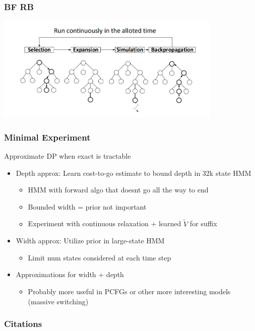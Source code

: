 \documentclass{beamer}
\begin{document}
\begin{frame}
\frametitle{BF RB}
\includegraphics[height=2in]{img/mcts.png}
\end{frame}

\begin{frame}
\frametitle{Minimal Experiment}
Approximate DP when exact is tractable
\begin{itemize}
\item Depth approx: Learn cost-to-go estimate to bound depth in 32k state HMM
    \begin{itemize}
    \item HMM with forward algo that doesnt go all the way to end
    \item Bounded width = prior not important
    \item Experiment with continuous relaxation + learned $\tilde{V}$
        for suffix
    \end{itemize}
\item Width approx: Utilize prior in large-state HMM
    \begin{itemize}
    \item Limit num states considered at each time step
    \end{itemize}
\item Approximations for width + depth
    \begin{itemize}
    \item Probably more useful in PCFGs or other more interesting models
        (massive switching)
    \end{itemize}
\end{itemize}
\end{frame}

\begin{frame}[allowframebreaks]
\frametitle{Citations}

\end{frame}
\end{document}
